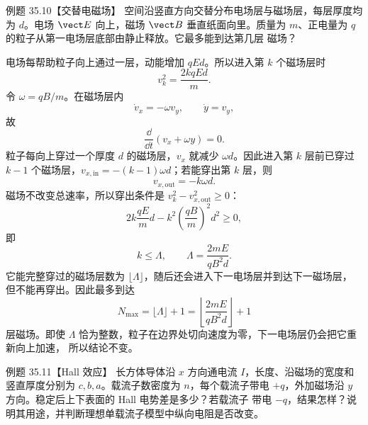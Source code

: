 \Needspace{0.44\textheight}
\begin{origexamplebox}{例题 35.10【交替电磁场】}
空间沿竖直方向交替分布电场层与磁场层，每层厚度均为 $d$。电场 $\vect E$ 向上，磁场 $\vect B$
垂直纸面向里。质量为 $m$、正电量为 $q$ 的粒子从第一电场层底部由静止释放。它最多能到达第几层
磁场？
\end{origexamplebox}

\begin{xesolution}
电场每帮助粒子向上通过一层，动能增加 $qEd$。所以进入第 $k$ 个磁场层时
\begin{equation}
  v_k^2=\frac{2kqEd}{m}.
\end{equation}
令 $\omega=qB/m$。在磁场层内
\[
  \dot v_x=-\omega v_y,
  \qquad \dot y=v_y,
\]
故
\begin{equation}
  \frac{\dd}{\dd t}(v_x+\omega y)=0.
\end{equation}
粒子每向上穿过一个厚度 $d$ 的磁场层，$v_x$ 就减少 $\omega d$。因此进入第 $k$ 层前已穿过
$k-1$ 个磁场层，$v_{x,\mathrm{in}}=-(k-1)\omega d$；若能穿出第 $k$ 层，则
\[
  v_{x,\mathrm{out}}=-k\omega d.
\]
磁场不改变总速率，所以穿出条件是 $v_k^2-v_{x,\mathrm{out}}^2\ge0$：
\begin{equation}
  2k\frac{qE}{m}d-k^2\left(\frac{qB}{m}\right)^2d^2\ge0,
\end{equation}
即
\begin{equation}
  k\le \Lambda,
  \qquad \Lambda=\frac{2mE}{qB^2d}.
\end{equation}
它能完整穿过的磁场层数为 $\lfloor\Lambda\rfloor$，随后还会进入下一电场层并到达下一磁场层，
但不能再穿出。因此最多到达
\begin{equation}
  \boxed{N_{\max}=\lfloor\Lambda\rfloor+1
  =\left\lfloor\frac{2mE}{qB^2d}\right\rfloor+1}
\end{equation}
层磁场。即使 $\Lambda$ 恰为整数，粒子在边界处切向速度为零，下一电场层仍会把它重新向上加速，
所以结论不变。

\alternatingLayersDiagram
\end{xesolution}

\Needspace{0.47\textheight}
\begin{origexamplebox}{例题 35.11【Hall 效应】}
长方体导体沿 $x$ 方向通电流 $I$，长度、沿磁场的宽度和竖直厚度分别为 $c,b,a$。载流子数密度为
$n$，每个载流子带电 $+q$，外加磁场沿 $y$ 方向。稳定后上下表面的 Hall 电势差是多少？若载流子
带电 $-q$，结果怎样？说明其用途，并判断理想单载流子模型中纵向电阻是否改变。
\end{origexamplebox}


